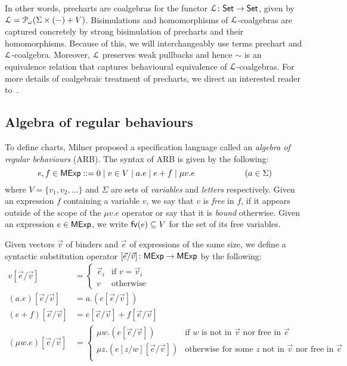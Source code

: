 In other words, precharts are coalgebras for the functor $\mathcal{L} \colon {\mathsf{Set}} \to {\mathsf{Set}}$, given by $\mathcal{L} = \mathcal{P}_\omega (\Sigma \times (-) + V)$. Bisimulations and homomorphisms of $\mathcal{L}$-coalgebras are captured concretely by strong bisimulation of precharts and their homomorphisms. Because of this, we will interchangeably use terms prechart and $\mathcal{L}$-coalgebra. Moreover, $\mathcal{L}$ preserves weak pullbacks and hence $\sim$ is an equivalence relation that captures behavioural equivalence of $\mathcal{L}$-coalgebras. For more details of coalgebraic treatment of precharts, we direct an interested reader to~\cite{Schmid:2021:Star}.
\subsection{Algebra of regular behaviours}
To define charts, Milner proposed a specification language called an \emph{algebra of regular behaviours} (ARB). The syntax of ARB is given by the following:
$$e,f \in \mathsf{MExp} ::= 0 \mid v \in V \mid a.e \mid e + f \mid \mu v. e \qquad\qquad\qquad (a \in \Sigma)$$
where $V=\{v_1, v_2, \dots\}$ and $\Sigma$ are sets of \emph{variables} and \emph{letters} respectively. Given an expression $f$ containing a variable $v$, we say that $v$ is \emph{free} in $f$, if it appears outside of the scope of the $\mu v.e$ operator or say that it is \emph{bound} otherwise. Given an expression $e \in \mathsf{MExp}$, we write $\mathsf{fv}(e) \subseteq V$ for the set of its free variables. 
\begin{definition}\label{def:subset}
	Given vectors $\vec{v}$ of binders and $\vec{e}$ of expressions of the same size, we define a syntactic substitution operator $[\vec{e}/\vec{v}] \colon \mathsf{MExp} \to \mathsf{MExp}$ by the following:
	\begin{align*}
		v[\vec{e}/\vec{v}] &= \begin{cases}
			\vec{e}_i & \text{if }v=\vec{v}_i\\
			v & \text{otherwise}
		\end{cases}\\
		(a.e)[\vec{e}/\vec{v}] &= a.(e[\vec{e}/\vec{v}])\\
		(e + f)[\vec{e}/\vec{v}] &= e[\vec{e}/\vec{v}] + f[\vec{e}/\vec{v}]\\
		(\mu w.e)[\vec{e}/\vec{v}] &= \begin{cases}
			\mu w. (e[\vec{e}/\vec{v}]) & \text{if } w \text{ is not in } \vec{v} \text{ nor free in } \vec{e}\\
			\mu z. (e[z/w][\vec{e}/\vec{v}]) & \text{otherwise for some } z \text{ not in } \vec{v} \text{ nor free in } \vec{e}\\
		\end{cases}
	\end{align*}
\end{definition}
